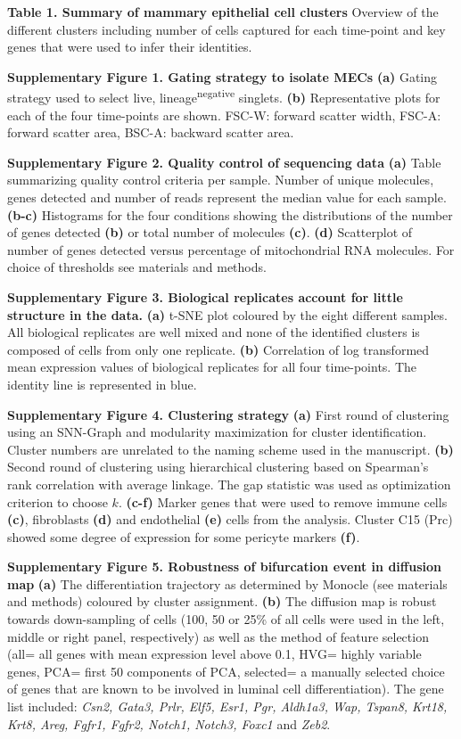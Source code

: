 \documentclass[titlepage, 12pt, oneside]{amsart}
\newcommand{\faketable}[1]%
{\refstepcounter{table}\label{#1}}
\begin{document}
\textbf{Table 1. Summary of mammary epithelial cell clusters}
\faketable{T1}
Overview of the different clusters including number of cells captured for each time-point and key genes that were used to infer their identities.

\textbf{Supplementary Figure 1. Gating strategy to isolate MECs}
\textbf{(a)} Gating strategy used to select live, lineage\textsuperscript{negative} singlets.
\textbf{(b)} Representative plots for each of the four time-points are shown. FSC-W: forward scatter width, FSC-A: forward scatter area, BSC-A: backward scatter area.

\textbf{Supplementary Figure 2. Quality control of sequencing data}
\textbf{(a)} Table summarizing quality control criteria per sample.
Number of unique molecules, genes detected and number of reads represent the median value for each sample.
\textbf{(b-c)} Histograms for the four conditions showing the distributions of the number of genes detected \textbf{(b)} or total number of molecules \textbf{(c)}.
\textbf{(d)} Scatterplot of number of genes detected versus percentage of mitochondrial RNA molecules.
For choice of thresholds see materials and methods.

\textbf{Supplementary Figure 3. Biological replicates account for little structure in the data.}
\textbf{(a)} t-SNE plot coloured by the eight different samples. All biological replicates are well mixed and none of the identified clusters is composed of cells from only one replicate.
\textbf{(b)} Correlation of log transformed mean expression values of biological replicates for all four time-points. The identity line is represented in blue.

\textbf{Supplementary Figure 4. Clustering strategy}
\textbf{(a)} First round of clustering using an SNN-Graph and modularity maximization for cluster identification. Cluster numbers are unrelated to the naming scheme used in the manuscript.
\textbf{(b)} Second round of clustering using hierarchical clustering based on Spearman's rank correlation with average linkage.
The gap statistic was used as optimization criterion to choose $k$.
\textbf{(c-f)} Marker genes that were used to remove immune cells \textbf{(c)}, fibroblasts \textbf{(d)} and endothelial \textbf{(e)} cells from the analysis. Cluster C15 (Prc) showed some degree of expression for some pericyte markers \textbf{(f)}.

\textbf{Supplementary Figure 5. Robustness of bifurcation event in diffusion map}
\textbf{(a)} The differentiation trajectory as determined by Monocle (see materials and methods) coloured by cluster assignment.
\textbf{(b)} The diffusion map is robust towards down-sampling of cells (100, 50 or 25\% of all cells were used in the left, middle or right panel, respectively) as well as the method of feature selection (all= all genes with mean expression level above 0.1, HVG= highly variable genes, PCA= first 50 components of PCA, selected= a manually selected choice of genes that are known to be involved in luminal cell differentiation).
The gene list included: \textit{Csn2, Gata3, Prlr, Elf5, Esr1, Pgr, Aldh1a3, Wap, Tspan8, Krt18, Krt8, Areg, Fgfr1, Fgfr2, Notch1, Notch3, Foxc1} and \textit{Zeb2}.
\end{document}
